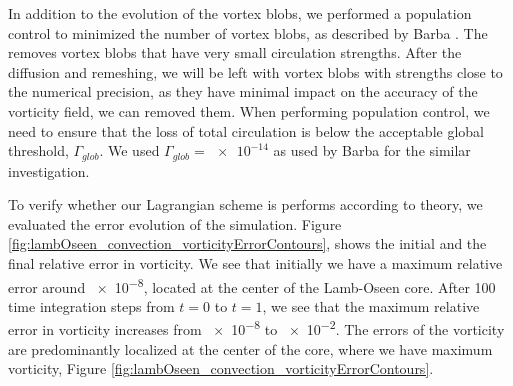 In addition to the evolution of the vortex blobs, we performed a population control to minimized the number of vortex blobs, as described by Barba \cite{Barba2004c}. The  removes vortex blobs that have very small circulation strengths. After the diffusion and remeshing, we will be left with vortex blobs with strengths close to the numerical precision, as they have minimal impact on the accuracy of the vorticity field, we can removed them. When performing population control, we need to ensure that the loss of total circulation is below the acceptable global threshold, $\Gamma_{glob}$. We used $\Gamma_{glob}=\num{e-14}$ as used by Barba \cite{Barba2004c} for the similar investigation. 

To verify whether our Lagrangian scheme is performs according to theory, we evaluated the error evolution of the simulation. Figure \ref{fig:lambOseen_convection_vorticityErrorContours}, shows the initial and the final relative error in vorticity. We see that initially we have a maximum relative error around \num{e-8}, located at the center of the Lamb-Oseen core. After 100 time integration steps from $t=0$ to $t=1$, we see that the maximum relative error in vorticity increases from \num{e-8} to \num{e-2}. The errors of the vorticity are predominantly localized at the center of the core, where we have maximum vorticity, Figure \ref{fig:lambOseen_convection_vorticityErrorContours}.

